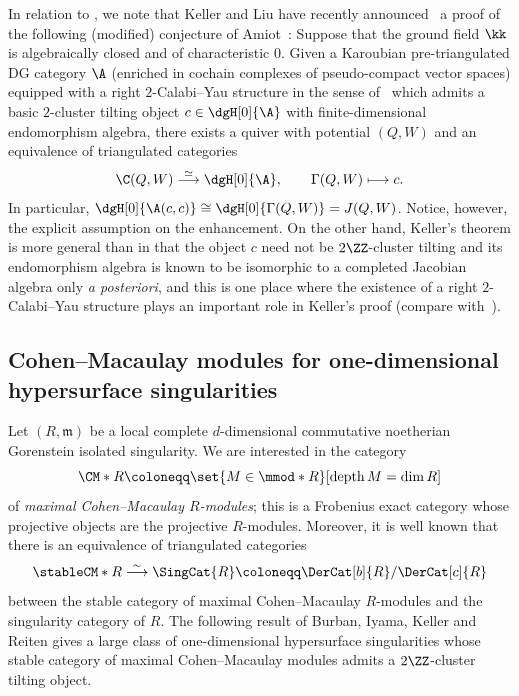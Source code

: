 \documentclass[a4paper]{amsart}
\begin{document}
\begin{remark}
  \label{rmk:Keller_announcement}
  In relation to , we note that
  Keller and Liu have recently announced~\cite{KL23a} a proof of the following (modified)
  conjecture of Amiot~\cite{Ami08}: Suppose that the ground field $\kk$ is
  algebraically closed and of characteristic $0$.
  Given a Karoubian pre-triangulated DG category $\A$ (enriched in cochain
  complexes of pseudo-compact
  vector spaces) equipped with a right
  $2$-Calabi--Yau structure in the sense of~\cite{KS06} which admits a basic
  $2$-cluster tilting object $c\in\dgH[0]{\A}$ with finite-dimensional
  endomorphism algebra, there exists a quiver with potential $(Q,W)$ and an
  equivalence of triangulated categories
  \[
    \C(Q,W)\stackrel{\simeq}{\longrightarrow}\dgH[0]{\A},\qquad
    \Gamma(Q,W)\longmapsto c.
  \]
  In particular, $\dgH[0]{\A(c,c)}\cong\dgH[0]{\Gamma(Q,W)}=J(Q,W)$. Notice,
  however, the explicit assumption on the enhancement. On the other hand,
  Keller's theorem is more general than  in that the
  object $c$ need not be $2\ZZ$-cluster tilting and its endomorphism algebra is
  known to be isomorphic to a completed Jacobian algebra only \emph{a
    posteriori}, and this is one place where the existence of a right
  $2$-Calabi--Yau structure plays an important role in Keller's proof (compare
  with~\cite{VdBer15}).
\end{remark}

\subsection{Cohen--Macaulay modules for one-dimensional hypersurface
  singularities}

Let $(R,\mathfrak{m})$ be a local complete $d$-dimensional commutative
noetherian Gorenstein isolated singularity. We are interested in the category
\[
  \CM*{R}\coloneqq\set{M\in\mmod*{R}}[\operatorname{depth}M=\dim R]
\]
of \emph{maximal Cohen--Macaulay $R$-modules}; this is a Frobenius exact
category whose projective objects are the projective $R$-modules. Moreover, it
is well known that there is an equivalence of triangulated
categories~\cite{Buc21}
\[
  \stableCM*{R}\stackrel{\sim}{\longrightarrow}\SingCat{R}\coloneqq\DerCat[b]{R}/\DerCat[c]{R}
\]
between the stable category of maximal Cohen--Macaulay $R$-modules and the
singularity category of $R$. The following result of Burban, Iyama, Keller and
Reiten gives a large class of one-dimensional hypersurface singularities whose
stable category of maximal Cohen--Macaulay modules admits a $2\ZZ$-cluster
tilting object.
\end{document}
